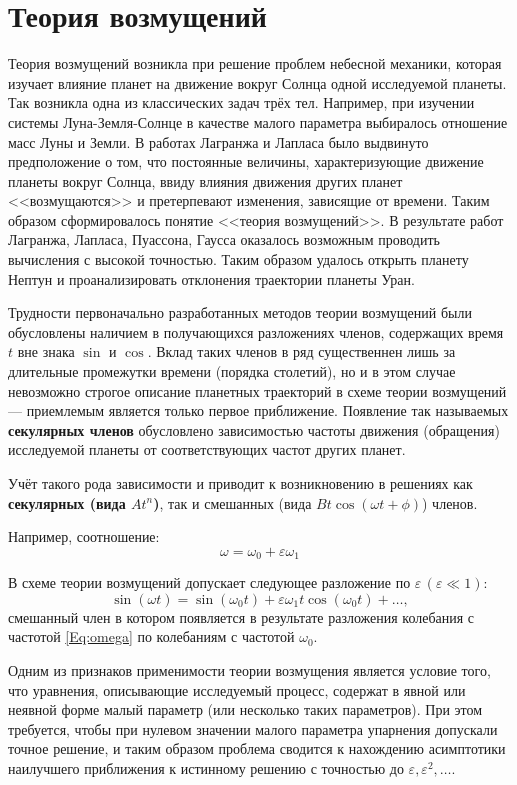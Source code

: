 \chapter*{Теория возмущений}

Теория возмущений возникла при решение
проблем небесной механики,
которая изучает влияние планет
на движение вокруг Солнца одной исследуемой планеты.
Так возникла одна из классических задач трёх тел.
Например, при изучении системы Луна-Земля-Солнце
в качестве малого параметра выбиралось
отношение масс Луны и Земли.
В работах Лагранжа и Лапласа было
выдвинуто предположение о том,
что постоянные величины,
характеризующие движение планеты вокруг Солнца,
ввиду влияния движения других планет <<возмущаются>>
и претерпевают изменения, зависящие от времени.
Таким образом сформировалось понятие <<теория возмущений>>.
В результате работ Лагранжа, Лапласа, Пуассона, Гаусса
оказалось возможным проводить вычисления с высокой точностью.
Таким образом удалось открыть планету Нептун
и проанализировать отклонения траектории планеты Уран.

Трудности первоначально разработанных методов теории возмущений
были обусловлены наличием в получающихся разложениях членов,
содержащих время $t$ вне знака $\sin$ и $\cos$.
Вклад таких членов в ряд существеннен лишь
за длительные промежутки времени (порядка столетий),
но и в этом случае невозможно строгое описание планетных
траекторий в схеме теории возмущений ---
приемлемым является только первое приближение.
Появление так называемых \textbf{секулярных членов}
обусловлено зависимостью частоты движения (обращения)
исследуемой планеты от соответствующих частот других планет.

Учёт такого рода зависимости и
приводит к возникновению в решениях
как \textbf{секулярных (вида $A t^n$)},
так и смешанных (вида $B t \cos(\omega t + \phi)$) членов.

Например, соотношение:
\begin{equation} \label{Eq:omega}
    \omega = \omega_0 + \varepsilon \omega_1 
\end{equation}

В схеме теории возмущений допускает
следующее разложение по $\varepsilon \, (\varepsilon \ll 1)$:
\begin{equation*}
    \sin(\omega t) = \sin(\omega_0 t) +
    \varepsilon \omega_1 t \cos(\omega_0 t) + \dots,
\end{equation*}
смешанный член в котором появляется в результате разложения
колебания с частотой \eqref{Eq:omega}
по колебаниям с частотой $\omega_0$.

Одним из признаков применимости теории возмущения
является условие того, что уравнения,
описывающие исследуемый процесс,
содержат в явной или неявной форме малый параметр
(или несколько таких параметров).
При этом требуется, чтобы при нулевом значении
малого параметра упарнения допускали точное решение,
и таким образом проблема сводится к нахождению
асимптотики наилучшего приближения к истинному решению
с точностью до $\varepsilon, \varepsilon^2, \dots$.
